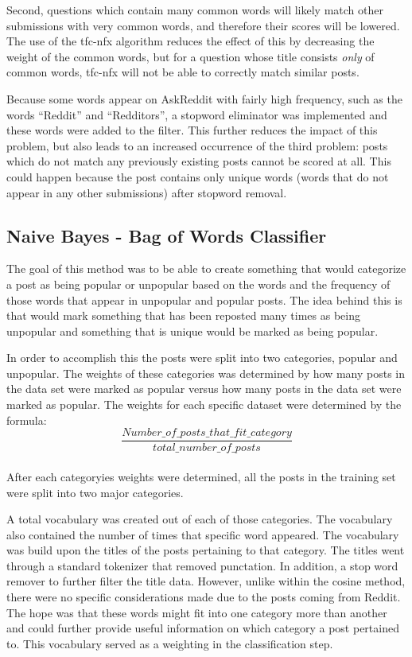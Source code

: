 \documentclass{acm_proc_article-sp}
\begin{document}
Second, questions which contain many common words will likely match other submissions with very common words, and therefore their
scores will be lowered.  The use of the tfc-nfx algorithm reduces the effect of this by decreasing the weight of the common words, but
for a question whose title consists \emph{only} of common words, tfc-nfx will not be able to correctly match similar posts.

Because some words appear on AskReddit with fairly high frequency, such as the words ``Reddit'' and ``Redditors'', a stopword eliminator
was implemented and these words were added to the filter.  This further reduces the impact of this problem, but also leads to an increased
occurrence of the third problem: posts which do not match any previously existing posts cannot be scored at all.  This could happen
because the post contains only unique words (words that do not appear in any other submissions) after stopword removal.

\subsection{Naive Bayes - Bag of Words Classifier}
The goal of this method was to be able to create something that would categorize a post as being popular or unpopular based on the words and the frequency of those words that appear in unpopular and popular posts. The idea behind this is that would mark something that has been reposted many times as being unpopular and something that is unique would be marked as being popular. 

In order to accomplish this the posts were split into two categories, popular and unpopular. The weights of these categories was determined by how many posts in the data set were marked as popular versus how many posts in the data set were marked as popular. The weights for each specific dataset were determined by the formula:\\ 
$$\frac{Number\_of\_posts\_that\_fit\_category}{total\_number\_of\_posts}$$\\
After each categoryies weights were determined, all the posts in the training set were split into two major categories.

A total vocabulary was created out of each of those categories. The vocabulary also contained the number of times that specific word appeared. The vocabulary was build upon the titles of the posts pertaining to that category. The titles went through a standard tokenizer that removed punctation. In addition, a stop word remover to further filter the title data. However, unlike within the cosine method, there were no specific considerations made due to the posts coming from Reddit. The hope was that these words might fit into one category more than another and could further provide useful information on which category a post pertained to. This vocabulary served as a weighting in the classification step.
\end{document}
